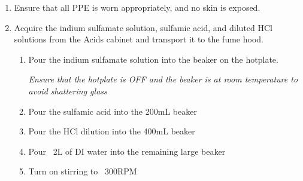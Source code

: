 \begin{center}
\begin{framed}
\begin{minipage}{0.8\textwidth}
\begin{enumerate}
                \item Ensure that all PPE is worn appropriately, and no skin is exposed.
                \item Acquire the indium sulfamate solution, sulfamic acid, and diluted HCl solutions from the Acids cabinet and transport it to the fume hood.
                \begin{enumerate}
                    \item Pour the indium sulfamate solution into the beaker on the hotplate.


                    \textit{Ensure that the hotplate is OFF and the beaker is at room temperature to avoid shattering glass}
                    \item Pour the sulfamic acid into the 200mL beaker
                    \item Pour the HCl dilution into the 400mL beaker
                    \item Pour ~2L of DI water into the remaining large beaker
                    \item Turn on stirring to ~300RPM
                \end{enumerate}
            \end{enumerate}
        \end{minipage}
    \end{framed}
\end{center}


